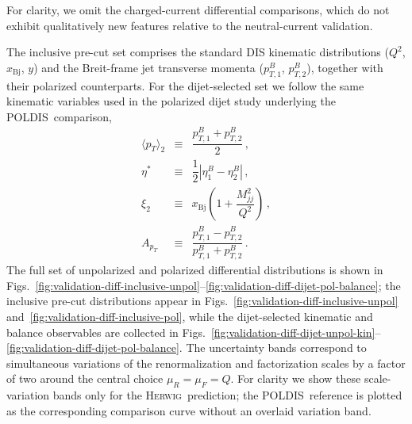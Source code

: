 \documentclass[a4paper,11pt]{article}
\newcommand{\Herwig}{\textsc{Herwig}}
\newcommand{\POLDIS}{\textsc{POLDIS}}
\begin{document}
For clarity, we omit the charged-current differential comparisons, which do not
exhibit qualitatively new features relative to the neutral-current validation.

The inclusive pre-cut set comprises the standard DIS kinematic distributions
($Q^2$, $x_{\mathrm{Bj}}$, $y$) and the Breit-frame jet transverse momenta
($p_{T,1}^{B}$, $p_{T,2}^{B}$), together with their polarized counterparts.
For the dijet-selected set we follow the same kinematic variables used in the polarized dijet study
underlying the \POLDIS\ comparison,
\begin{equation}
\begin{array}{rcl}
\langle p_T\rangle_2 &\equiv& \dfrac{p_{T,1}^{B}+p_{T,2}^{B}}{2}\,, \\[2mm]
\eta^\ast &\equiv& \dfrac{1}{2}\left|\eta_1^B-\eta_2^B\right|\,, \\[2mm]
\xi_2 &\equiv& x_{\mathrm{Bj}}\left(1+\dfrac{M_{jj}^2}{Q^2}\right)\,, \\[2mm]
A_{p_T} &\equiv& \dfrac{p_{T,1}^{B}-p_{T,2}^{B}}{p_{T,1}^{B}+p_{T,2}^{B}}\,.
\end{array}
\end{equation}
The full set of unpolarized and polarized differential distributions is shown in
Figs.~\ref{fig:validation-diff-inclusive-unpol}--\ref{fig:validation-diff-dijet-pol-balance};
the inclusive pre-cut distributions appear in
Figs.~\ref{fig:validation-diff-inclusive-unpol}
and~\ref{fig:validation-diff-inclusive-pol}, while
the dijet-selected kinematic and balance observables are collected in
Figs.~\ref{fig:validation-diff-dijet-unpol-kin}--\ref{fig:validation-diff-dijet-pol-balance}.
The uncertainty bands correspond to simultaneous variations of the renormalization and factorization scales by a factor of two around the central choice $\mu_R = \mu_F = Q$. For clarity we show these scale-variation bands only for the \Herwig\ prediction; the \POLDIS\ reference is plotted as the corresponding comparison curve without an overlaid variation band.
\end{document}
